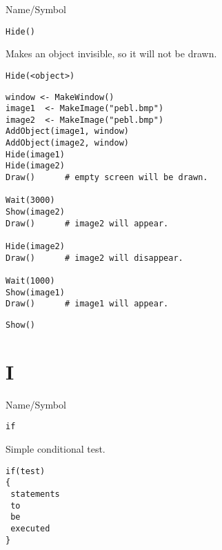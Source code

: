 \begin{desc}{Name/Symbol}
\item[Name/Symbol]	\verb+Hide()+ 

\item[Description]	Makes an object invisible, so it will not be drawn.

\item[Usage]
\begin{verbatim}
Hide(<object>)
\end{verbatim}

\item[Example]
\begin{verbatim}
window <- MakeWindow()
image1  <- MakeImage("pebl.bmp")
image2  <- MakeImage("pebl.bmp")
AddObject(image1, window)
AddObject(image2, window)
Hide(image1)
Hide(image2)
Draw()		# empty screen will be drawn.
	
Wait(3000)
Show(image2)
Draw()		# image2 will appear.

Hide(image2)
Draw()		# image2 will disappear.

Wait(1000)
Show(image1)
Draw()		# image1 will appear.
\end{verbatim}
 
\item[See Also]	\verb+Show()+
\end{desc}

\rl


\section{I}
\rl


\begin{desc}{Name/Symbol}
\item[Name/Symbol]	\verb+if+ 

\item[Description]	Simple conditional test.

\item[Usage]
\begin{verbatim}
if(test)
{
 statements
 to
 be 
 executed
}
\end{verbatim}

\item[Example]	

\item[See Also]	
\end{desc}

\rl





